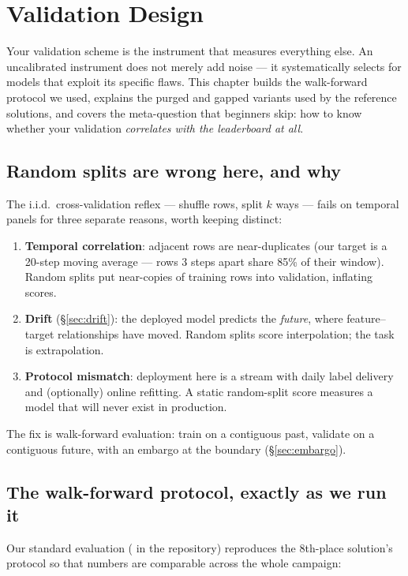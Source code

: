 \chapter{Validation Design}
\label{ch:validation}

Your validation scheme is the instrument that measures everything else. An
uncalibrated instrument does not merely add noise --- it systematically
selects for models that exploit its specific flaws. This chapter builds the
walk-forward protocol we used, explains the purged and gapped variants used
by the reference solutions, and covers the meta-question that beginners
skip: how to know whether your validation \emph{correlates with the
leaderboard at all}.

\section{Random splits are wrong here, and why}

The i.i.d.\ cross-validation reflex --- shuffle rows, split $k$ ways ---
fails on temporal panels for three separate reasons, worth keeping distinct:

\begin{enumerate}
\item \textbf{Temporal correlation}: adjacent rows are near-duplicates
  (our target is a 20-step moving average --- rows 3 steps apart share 85\%
  of their window). Random splits put near-copies of training rows into
  validation, inflating scores.
\item \textbf{Drift} (\S\ref{sec:drift}): the deployed model predicts the
  \emph{future}, where feature--target relationships have moved. Random
  splits score interpolation; the task is extrapolation.
\item \textbf{Protocol mismatch}: deployment here is a stream with daily
  label delivery and (optionally) online refitting. A static random-split
  score measures a model that will never exist in production.
\end{enumerate}

The fix is walk-forward evaluation: train on a contiguous past, validate on
a contiguous future, with an embargo at the boundary
(\S\ref{sec:embargo}).

\section{The walk-forward protocol, exactly as we run it}

Our standard evaluation ( in the repository) reproduces the
8th-place solution's protocol so that numbers are comparable across the
whole campaign:

